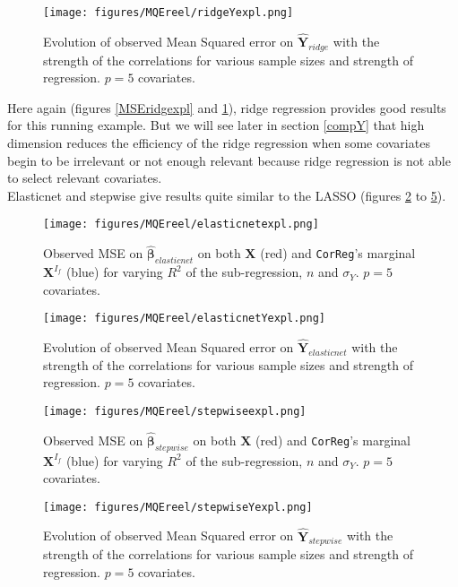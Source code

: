 \documentclass[12pt,a4paper]{report}
\begin{document}
	 \begin{figure}
	 \centering
	  \texttt{[image: figures/MQEreel/ridgeYexpl.png]}
	  \caption{Evolution of observed Mean Squared error on $\hat{\boldsymbol{Y}}_{ridge}$ with the strength of the correlations for various sample sizes and strength of regression. $p=5$ covariates. } \label{MQEridgeYexpl}
	\end{figure}	
Here again (figures \ref{MSEridgexpl} and \ref{MQEridgeYexpl}), ridge regression provides good results for this running example. But we will see later in section \ref{compY} that high dimension reduces the efficiency of the ridge regression when some covariates begin to be irrelevant or not enough relevant because ridge regression is not able to select relevant covariates. \\

Elasticnet and stepwise give results quite similar to the LASSO (figures \ref{MSEelasticnetexpl} to \ref{MQEstepwiseYexpl}).
	\begin{figure}[h!]
	\texttt{[image: figures/MQEreel/elasticnetexpl.png]}
	\caption{Observed MSE on $\hat{\boldsymbol{\beta}}_{elasticnet}$ on both $\boldsymbol{X}$ (red) and {\tt CorReg}'s marginal $\boldsymbol{X}^{I_f}$ (blue) for varying $R^2$ of the sub-regression, $n$ and $\sigma_Y$. $p=5$ covariates.}\label{MSEelasticnetexpl}
\end{figure} 
	
	 \begin{figure}
	 \centering
	  \texttt{[image: figures/MQEreel/elasticnetYexpl.png]}
	  \caption{Evolution of observed Mean Squared error on $\hat{\boldsymbol{Y}}_{elasticnet}$ with the strength of the correlations for various sample sizes and strength of regression. $p=5$ covariates. } \label{MQEelasticnetYexpl}
	\end{figure}
	\begin{figure}[h!]
	\texttt{[image: figures/MQEreel/stepwiseexpl.png]}\label{MSEstepwiseexpl}
	\caption{Observed MSE on $\hat{\boldsymbol{\beta}}_{stepwise}$ on both $\boldsymbol{X}$ (red) and {\tt CorReg}'s marginal $\boldsymbol{X}^{I_f}$ (blue) for varying $R^2$ of the sub-regression, $n$ and $\sigma_Y$. $p=5$ covariates.}
\end{figure} 
	
	 \begin{figure}
	 \centering
	  \texttt{[image: figures/MQEreel/stepwiseYexpl.png]}
	  \caption{Evolution of observed Mean Squared error on $\hat{\boldsymbol{Y}}_{stepwise}$ with the strength of the correlations for various sample sizes and strength of regression. $p=5$ covariates. } \label{MQEstepwiseYexpl}
	\end{figure}
	
\end{document}
